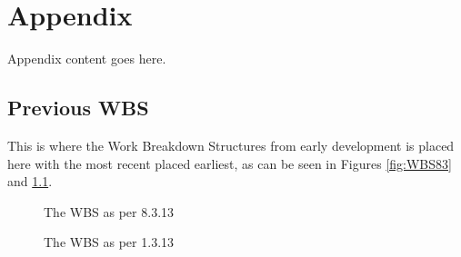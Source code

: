 \appendix

\chapter{Appendix}
Appendix content goes here.
\section{Previous WBS}
This is where the Work Breakdown Structures from early development is placed here with the most recent placed earliest, as can be seen in Figures \ref{fig:WBS83} and \ref{fig:WBS13}.
\begin{figure}[p]

\setlength\fboxsep{0pt}
\setlength\fboxrule{1pt}\noindent{}

\caption{The WBS as per 8.3.13}
\end{figure}

\begin{figure}[p]

\setlength\fboxsep{0pt}
\setlength\fboxrule{1pt}\noindent{}
\label{fig:WBS13}
\caption{The WBS as per 1.3.13}
\end{figure}

